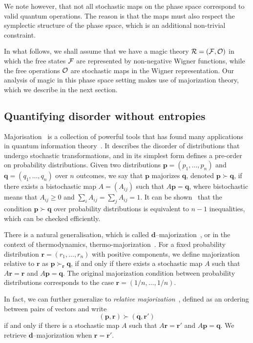 \documentclass[
onecolumn,
superscriptaddress
]{revtex4-1}
\def\r{\boldsymbol{r}}
\def\p{\boldsymbol{p}}
\def\q{\boldsymbol{q}}
\def\d{\boldsymbol{d}}
\def\q{\boldsymbol{q}}
\def\R{{\cal R}}
\def\F{{\cal F}}
\renewcommand{\O}{{\cal O}}
\begin{document}
We note however, that not all stochastic maps on the phase space correspond to valid quantum operations. The reason is that the maps must also respect the symplectic structure of the phase space, which is an additional non-trivial constraint.

In what follows, we shall assume that we have a magic theory $\R = (\F, \O)$ in which the free states $\F$ are represented by non-negative Wigner functions, while the free operations $\O$ are stochastic maps in the Wigner representation. Our analysis of magic in this phase space setting makes use of majorization theory, which we describe in the next section.



\subsection*{Quantifying disorder without entropies}

Majorisation~\cite{cit:marshall, Blackwell_1953} is a collection of powerful tools that has found many applications in quantum information theory~\cite{Nielsen_1999, cit:cwiklinski, cit:lostaglio2, cit:gour, cit:gour2, Horodecki_2003, Puchala_2013, Vallejos_2021}.
It describes the disorder of distributions that undergo stochastic transformations, and in its simplest form defines a pre-order on probability distributions. Given two distributions $\p= (p_1, \dots, p_n)$ and $\q = (q_1, \dots, q_n)$ over $n$ outcomes, we say that $\p$ majorizes $\q$, denoted $\p \succ \q$, if there exists a bistochastic map $A = (A_{ij})$ such that $A\p = \q$, where bistochastic means that $A_{ij} \geq 0$ and $\sum_i A_{ij} = \sum_j A_{ij} = 1$. It can be shown~\cite{cit:marshall} that the condition $ \p \succ \q$ over probability distributions is equivalent to $n-1$ inequalities, which can be checked efficiently.

There is a natural generalisation, which is called $\d$--majorization~\cite{Veinott_1971}, or in the context of thermodynamics, thermo-majorization~\cite{cit:horodecki2013}. For a fixed probability distribution $\r = (r_1, \dots, r_n)$ with positive components, we define majorization relative to $\r$ as $\p \succ_{\r} \q$, if and only if there exists a stochastic map $A$ such that $A\r = \r$ and $A \p = \q$. The original majorization condition between probability distributions corresponds to the case $\r = (1/n, \dots, 1/n)$. 

In fact, we can further generalize to \emph{relative majorization}~\cite{Blackwell_1953, Ruch_1976, ruch_mixing_1978, Renes_2016, Buscemi_2017, Rethinasamy_2020}, defined as an ordering between pairs of vectors and write 
\begin{equation}
	(\p,\r) \succ (\q, \r')
\end{equation}
if and only if there is a stochastic map $A$ such that $A\r = \r'$ and $A\p = \q$. We retrieve $\d$--majorization when $\r = \r'$.
\end{document}
